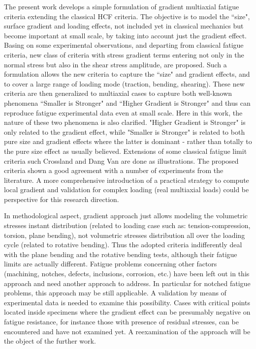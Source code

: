 The present work develops a simple formulation of gradient multiaxial fatigue criteria extending the
classical HCF criteria. The objective is to model the ``size", surface gradient and loading effects, not
included yet in classical mechanics but become important at small scale, by taking into account just the
gradient effect. Basing on some experimental observations, and departing from classical fatigue criteria, new class of
criteria with stress gradient terms entering not only in the normal stress but also in the shear stress
amplitude, are proposed. Such a formulation allows the new criteria to capture the ``size" and gradient
effects, and to cover a large range of loading mode (traction, bending, shearing). These new criteria
are then generalized to multiaxial cases to capture both well-known phenomena ``Smaller is Stronger"
and ``Higher Gradient is Stronger" and thus can reproduce fatigue experimental data even at small scale.
Here in this work, the nature of these two phenomena is also clarified. "Higher Gradient is Stronger" is
only related to the gradient effect, while "Smaller is Stronger" is related to both pure size and gradient
effects where the latter is dominant - rather than totally to the pure size effect as usually believed.
Extensions of some classical fatigue limit criteria such Crossland and Dang Van are done as illustrations.
The proposed criteria shown a good agreement with a number of experiments from the literature. A
more comprehensive introduction of a practical strategy to compute local gradient and validation  for complex loading (real multiaxial loads) could be perspective for this
research direction. 

In methodological aspect, gradient approach just allows modeling the volumetric stresses instant distribution (related to loading case such as: tension-compression, torsion, plane bending), not volumetric stresses distribution all over the loading cycle (related to rotative bending). Thus the adopted criteria indifferently deal with the plane bending and the rotative bending tests, although their fatigue limits are actually different. Fatigue problems concerning other factors (machining, notches, defects, inclusions, corrosion, etc.) have been left out in this approach and need another approach to address. In particular for notched fatigue problems, this approach may be still applicable. A validation by means of experimental data is needed to examine this possibility. Cases with critical points located inside specimens where the gradient effect can be presumably negative on fatigue resistance, for instance those with presence of residual stresses, can be encountered and have not examined yet. A reexamination of the approach will be the object of the further work.